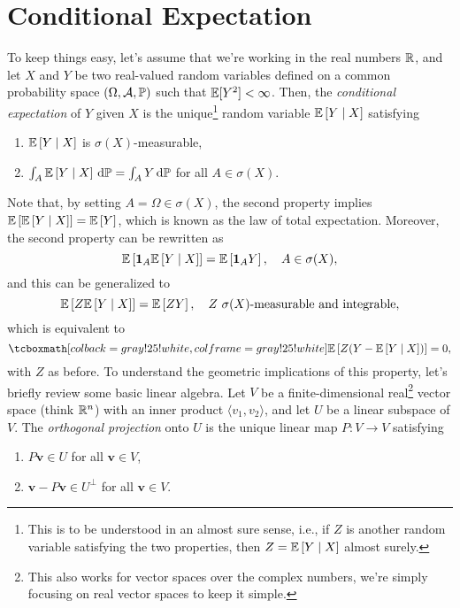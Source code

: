 \section{Conditional Expectation}

To keep things easy, let's assume that we're working in the real numbers $\R$, and let $X$ and $Y$ be two real-valued random variables defined on a common probability space $(\Omega, \mathcal{A}, \P)$ such that $\ex{Y^2} < \infty$. Then, the \emph{conditional expectation} of $Y$ given $X$ is the unique\footnote{This is to be understood in an almost sure sense, i.e., if $Z$ is another random variable satisfying the two properties, then $Z = \Ex{Y \given X}$ almost surely.} random variable $\Ex{Y \given X}$ satisfying
\begin{enumerate}
    \item $\Ex{Y \given X}$ is $\sigma(X)$-measurable,
    
    \item $\int_A \Ex{Y \given X} \, \mathrm{d}\P = \int_A Y \, \mathrm{d}\P$ \quad for all $A \in \sigma(X)$.
\end{enumerate}
Note that, by setting $A = \Omega \in \sigma(X)$, the second property implies $\Ex{\Ex{Y \given X}} = \Ex{Y}$, which is known as the law of total expectation. Moreover, the second property can be rewritten as
\[
    \Ex{\indicator{A} \Ex{Y \given X}} = \Ex{\indicator{A} Y}, \quad A \in \sigma(X),
\]
and this can be generalized to
\[
    \Ex{Z \Ex{Y \given X}} = \Ex{ZY}, \quad Z \text{ } \sigma(X)\text{-measurable and integrable},
\]
which is equivalent to
\begin{equation}
    \label{eq: orthogonality of conditional expectation}
    \highlightMath{
        \Ex{Z (Y - \Ex{Y \given X})} = 0,
    }
\end{equation}
with $Z$ as before. To understand the geometric implications of this property, let's briefly review some basic linear algebra. Let $V$ be a finite-dimensional real\footnote{This also works for vector spaces over the complex numbers, we're simply focusing on real vector spaces to keep it simple.} vector space (think $\R^n$) with an inner product $\langle v_1, v_2 \rangle$, and let $U$ be a linear subspace of $V$. The \emph{orthogonal projection} onto $U$ is the unique linear map $P \colon V \to V$ satisfying
\begin{enumerate}
    \item $P \mathbf{v} \in U$ for all $\mathbf{v} \in V$,

    \item $\mathbf{v} - P \mathbf{v} \in U^{\bot}$ for all $\mathbf{v} \in V$.
\end{enumerate}
